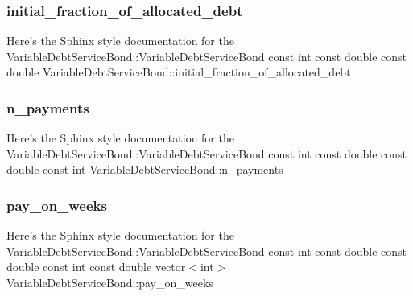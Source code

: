 \subsubsection{\texorpdfstring{initial\+\_\+fraction\+\_\+of\+\_\+allocated\+\_\+debt}{initial\_fraction\_of\_allocated\_debt}}
{\footnotesize\ttfamily Here’s the Sphinx style documentation for the Variable\+Debt\+Service\+Bond\+::\+Variable\+Debt\+Service\+Bond const int const double const double Variable\+Debt\+Service\+Bond\+::initial\+\_\+fraction\+\_\+of\+\_\+allocated\+\_\+debt}

\mbox{\label{classVariableDebtServiceBond_ab4035559da3d8155d792612e628285ae}} 
\subsubsection{\texorpdfstring{n\+\_\+payments}{n\_payments}}
{\footnotesize\ttfamily Here’s the Sphinx style documentation for the Variable\+Debt\+Service\+Bond\+::\+Variable\+Debt\+Service\+Bond const int const double const double const int Variable\+Debt\+Service\+Bond\+::n\+\_\+payments}

\mbox{\label{classVariableDebtServiceBond_a9ba0adce7f7b3f30e14e55837424ff7c}} 
\subsubsection{\texorpdfstring{pay\+\_\+on\+\_\+weeks}{pay\_on\_weeks}}
{\footnotesize\ttfamily Here’s the Sphinx style documentation for the Variable\+Debt\+Service\+Bond\+::\+Variable\+Debt\+Service\+Bond const int const double const double const int const double vector$<$int$>$ Variable\+Debt\+Service\+Bond\+::pay\+\_\+on\+\_\+weeks}

\mbox{\label{classVariableDebtServiceBond_ac011dd32658be19f8dfc72e7d3b1e02c}} 
